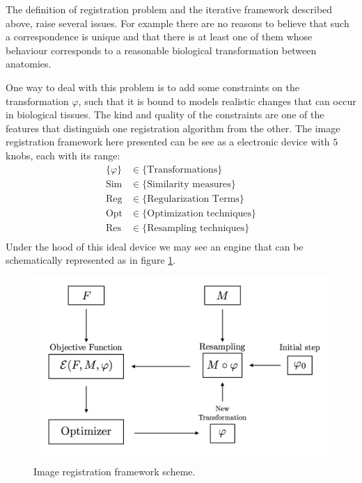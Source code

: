 The definition of registration problem and the iterative framework described above, raise several issues. For example there are no reasons to believe that such a correspondence is unique and that there is at least one of them whose behaviour corresponds to a reasonable biological transformation between anatomies.

One way to deal with this problem is to add some constraints on the transformation $\varphi$, such that it is bound to models realistic changes that can occur in biological tissues. The kind and quality of the constraints are one of the features that distinguish one registration algorithm from the other. 
The image registration framework here presented can be see as a electronic device with $5$ knobs, each with its range:
\begin{align*}
\{  \varphi \} &\in \{ \text{Transformations}\}\\
\text{Sim} &\in \{ \text{Similarity measures}\}\\
\text{Reg} &\in \{ \text{Regularization Terms}\}\\
\text{Opt} &\in \{ \text{Optimization techniques}\}\\
\text{Res} &\in \{ \text{Resampling techniques}\}\\
\end{align*}
Under the hood of this ideal device we may see an engine that can be schematically represented as in figure \ref{fig:iterative_algorithm_scheme}.
\begin{figure}[!ht]
	\centering
	\includegraphics[scale=0.235]{figures/iterative_algorithm.png}
	\caption{Image registration framework scheme.}
	\label{fig:iterative_algorithm_scheme}
\end{figure}

